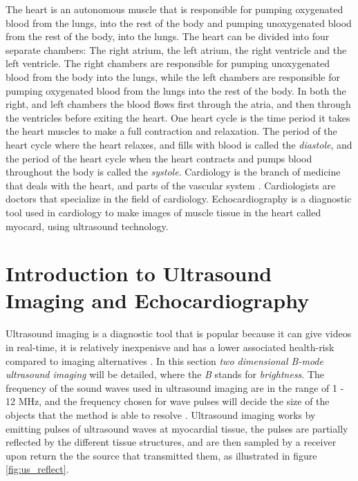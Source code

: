 The heart is an autonomous muscle that is responsible for pumping oxygenated blood from the lungs, into the rest of the body and pumping unoxygenated blood from the rest of the body, into the lungs. The heart can be divided into four separate chambers: The right atrium, the left atrium, the right ventricle and the left ventricle. The right chambers are responsible for pumping unoxygenated blood from the body into the lungs, while the left chambers are responsible for pumping oxygenated blood from the lungs into the rest of the body. In both the right, and left chambers the blood flows first through the atria, and then through the ventricles before exiting the heart. One heart cycle is the time period it takes the heart muscles to make a full contraction and relaxation. The period of the heart cycle where the heart relaxes, and fills with blood is called the \textit{diastole}, and the period of the heart cycle when the heart contracts and pumps blood throughout the body is called the \textit{systole}. Cardiology is the branch of medicine that deals with the heart, and parts of the vascular system \cite{cardiology_wikipedia}. Cardiologists are doctors that specialize in the field of cardiology. Echocardiography is a diagnostic tool used in cardiology to make images of muscle tissue in the heart called myocard, using ultrasound technology. 

\section{Introduction to Ultrasound Imaging and Echocardiography}

Ultrasound imaging is a diagnostic tool that is popular because it can give videos in real-time, it is relatively inexpenisve and has a lower associated health-risk compared to imaging alternatives \cite{medical_ultrasound_wikipedia}. In this section \textit{two dimensional B-mode ultrasound imaging} will be detailed, where the \textit{B} stands for \textit{brightness}. The frequency of the sound waves used in ultrasound imaging are in the range of 1 - 12 MHz, and the frequency chosen for wave pulses will decide the size of the objects that the method is able to resolve \cite{basic_ultrasound}. Ultrasound imaging works by emitting pulses of ultrasound waves at myocardial tissue, the pulses are partially reflected by the different tissue structures, and are then sampled by a receiver upon return the the source that transmitted them, as illustrated in figure \ref{fig:us_reflect}.

